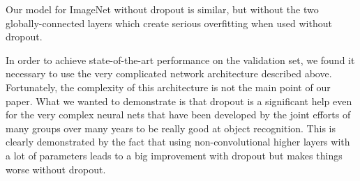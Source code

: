 \documentclass[12pt]{article}
\begin{document}
Our model for ImageNet without dropout is similar, but without the
two globally-connected layers which create serious overfitting when
used without dropout.

In order to achieve state-of-the-art performance on the validation
set, we found it necessary to use the very complicated network
architecture described above. Fortunately, the complexity of this
architecture is not the main point of our paper. What we wanted to
demonstrate is that dropout is a significant help even for the very complex
neural nets that have been developed by the joint efforts of many
groups over many years to be really good at object recognition. This
is clearly demonstrated by the fact that using non-convolutional
higher layers with a lot of parameters leads to a big improvement with
dropout but makes things worse without dropout.
\end{document}
